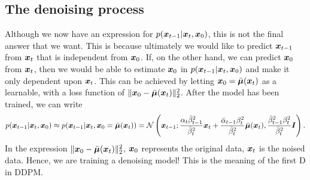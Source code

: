 \subsection{The denoising process}
Although we now have an expression for  $p(\bm{x}_{t-1}|\bm{x}_{t},\bm{x}_0)$, this is not the final answer that we want. This is because ultimately we would like to predict $\bm{x}_{t-1}$ from $\bm{x}_{t}$ that is independent from $\bm{x}_0$. If, on the other hand, we can predict $\bm{x}_0$ from $\bm{x}_{t}$, then we would be able to estimate $\bm{x}_0$ in $p(\bm{x}_{t-1}|\bm{x}_{t},\bm{x}_0)$ and make it only dependent upon $\bm{x}_{t}$. This can be achieved by letting $\bm{x}_0=\bar{\bm{\mu}}(\bm{x}_{t})$ as a learnable, with a loss function of $\|\bm{x}_0-\bar{\bm{\mu}}(\bm{x}_{t})\|_2^2$. After the model has been trained, we can write
\begin{equation}
    \label{eq:3.10}
    p(\bm{x}_{t-1}|\bm{x}_{t},\bm{x}_0)\approx p(\bm{x}_{t-1}|\bm{x}_{t},\bm{x}_0=\bar{\bm{\mu}}(\bm{x}_{t}))=\mathcal{N}\left(\bm{x}_{t-1}; \frac{\alpha_t\bar{\beta}_{t-1}^2}{\bar{\beta}_t^2}\bm{x}_{t}+\frac{\bar{\alpha}_{t-1}\beta_t^2}{\bar{\beta}_t^2}\bar{\bm{\mu}}(\bm{x}_{t}),\frac{\bar{\beta}_{t-1}^2\beta_t^2}{\bar{\beta}_t^2}\bm{I}  \right).
\end{equation}
In the expression $\|\bm{x}_0-\bar{\bm{\mu}}(\bm{x}_{t})\|_2^2$, $\bm{x}_0$ represents the original data, $\bm{x}_{t}$ is the noised data. Hence, we are training a denoising model! This is the meaning of the first D in DDPM.

